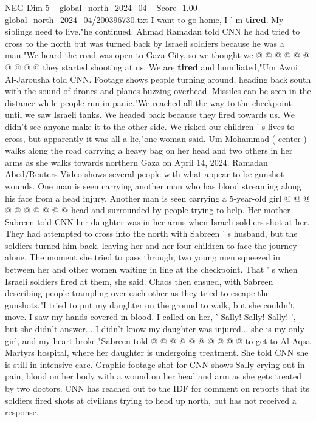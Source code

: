 \begin{textsample}{NEG Dim 5 – global\_north\_2024\_04 – Score -1.00 – global\_north\_2024\_04/200396730.txt}
I want to go home, I ' m \textbf{tired}.
My siblings need to live,"he continued.
Ahmad Ramadan told CNN he had tried to cross to the north but was turned back by Israeli soldiers because he was a man."We heard the road was open to Gaza City, so we thought we @ @ @ @ @ @ @ @ @ @ they started shooting at us.
We are \textbf{tired} and humiliated,"Um Awni Al-Jarousha told CNN.
Footage shows people turning around, heading back south with the sound of drones and planes buzzing overhead.
Missiles can be seen in the distance while people run in panic."We reached all the way to the checkpoint until we saw Israeli tanks.
We headed back because they fired towards us.
We didn't see anyone make it to the other side.
We risked our children ' s lives to cross, but apparently it was all a lie,"one woman said.
Um Mohammad ( center ) walks along the road carrying a heavy bag on her head and two others in her arms as she walks towards northern Gaza on April 14, 2024.
Ramadan Abed/Reuters Video shows several people with what appear to be gunshot wounds.
One man is seen carrying another man who has blood streaming along his face from a head injury.
Another man is seen carrying a 5-year-old girl @ @ @ @ @ @ @ @ @ @ head and surrounded by people trying to help.
Her mother Sabreen told CNN her daughter was in her arms when Israeli soldiers shot at her.
They had attempted to cross into the north with Sabreen ' s husband, but the soldiers turned him back, leaving her and her four children to face the journey alone.
The moment she tried to pass through, two young men squeezed in between her and other women waiting in line at the checkpoint.
That ' s when Israeli soldiers fired at them, she said.
Chaos then ensued, with Sabreen describing people trampling over each other as they tried to escape the gunshots."I tried to put my daughter on the ground to walk, but she couldn't move.
I saw my hands covered in blood.
I called on her, ' Sally!
Sally!
Sally! ', but she didn't answer...
I didn't know my daughter was injured... she is my only girl, and my heart broke,"Sabreen told @ @ @ @ @ @ @ @ @ @ to get to Al-Aqsa Martyrs hospital, where her daughter is undergoing treatment.
She told CNN she is still in intensive care.
Graphic footage shot for CNN shows Sally crying out in pain, blood on her body with a wound on her head and arm as she gets treated by two doctors.
CNN has reached out to the IDF for comment on reports that its soldiers fired shots at civilians trying to head up north, but has not received a response.

\end{textsample}
